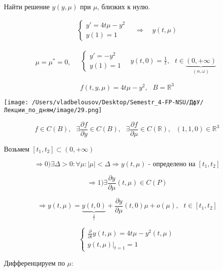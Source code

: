 \documentclass[12pt, a4paper]{report}
\begin{document}
Найти решение \( y (y , \mu ) \)  при \( \mu  \), близких к нулю.

\[ \begin{aligned}
    \begin{cases}
        y ' = 4t \mu - y ^2 \\ 
        y (1 ) = 1 
        \end{cases}
        \quad \Rightarrow \quad  
        y(t , \mu)
\end{aligned} \] 

\[ \mu = \mu^ * = 0 , \quad  \begin{aligned}
    \begin{cases}
        y ' = - y ^2  \\ 
        y(1 ) =1 
        \end{cases} 
        \quad  y(t , 0 ) = \frac{1}{ t }  , \text{ } t \in  \underbrace{( 0, + \infty  )}_{(\alpha , \omega)}
\end{aligned} \] 

\[ f ( t ,y ,\mu ) = 4 t \mu - y ^2 , \text{ }  B =\mathbb{R} ^3  \] 

\begin{center}
    \texttt{[image: /Users/vladbelousov/Desktop/Semestr\_4-FP-NSU/ДфУ/Лекции\_по\_дням/image/29.png]}
\end{center}

\[ f  \in  C (B ) , \text{ } \exists  \frac{\partial  f }{\partial y  }  \in  C (B ) , \text{ }  \exists  \frac{\partial  f }{\partial  \mu} \in  C ( \mathbb{R} ) , \text{ }  (1, 1, 0 ) \in \mathbb{R} ^3 \] 

Возьмем  \( [ t_1, t_2 ] \subset (  0, + \infty  ) \) 

\[ \Rightarrow 0 ) \exists  \Delta > 0 :  \forall \mu    : |\mu| < \Delta \Rightarrow y(t, \mu ) \text{ - определено на } [t_1,t_2 ]   \] 

\[ \Rightarrow 1) \exists  \frac{\partial  y }{\partial  \mu } ( t, \mu ) \in  C ( P )  \] 

\[ \Rightarrow y(t, \mu ) = \underbrace{y ( t, 0 )}_{\frac{1}{t  } } + \frac{\partial  y } {\partial  \mu } (t ,0 ) \mu    + o( \mu ) , \text{ } t \in  [t_1,t_2 ]  \] 

\[ \begin{cases}
    \frac{\partial  }{\partial  t } y ( t, \mu ) = 4 t \mu - y ^2 ( t, \mu )  \\
    y ( t ,\mu)  |_{t =1 }  =1 
\end{cases} \] 

Дифференцируем по \( \mu  \): 
\end{document}
